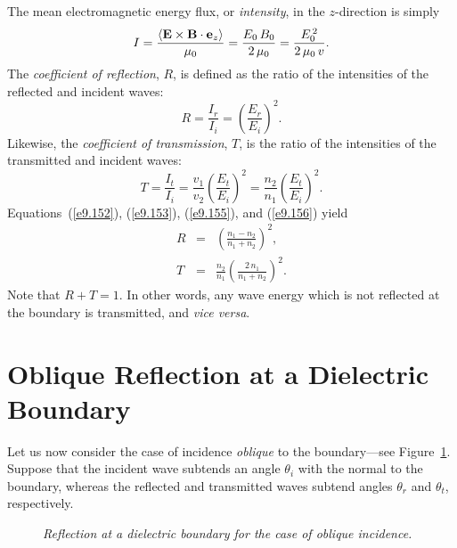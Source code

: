 The mean electromagnetic energy flux, or {\em intensity}, in the $z$-direction is simply
\begin{equation}
I =\frac{\langle {\bf E}\times{\bf B}\cdot{\bf e}_z\rangle}{\mu_0}= \frac{E_0\,B_0}{2\,\mu_0} = \frac{E_0^{\,2}}{2\,\mu_0\,v}.
\end{equation}
The {\em coefficient of reflection}, $R$, is defined as the ratio
of the intensities of the reflected and incident waves:
\begin{equation}\label{e9.155}
R = \frac{I_r}{I_i} = \left(\frac{E_r}{E_i}\right)^2.
\end{equation}
Likewise, the {\em coefficient of transmission}, $T$, is the ratio of
the intensities of the transmitted and incident waves:
\begin{equation}\label{e9.156}
T = \frac{I_t}{I_i} =\frac{v_1}{v_2}\left(\frac{E_t}{E_i}\right)^2=\frac{n_2}{n_1}\left(\frac{E_t}{E_i}\right)^2.
\end{equation}
Equations~(\ref{e9.152}), (\ref{e9.153}), (\ref{e9.155}), and (\ref{e9.156})
yield
\begin{eqnarray}
R &=& \left(\frac{n_1-n_2}{n_1+n_2}\right)^2,\\[0.5ex]
T&=&\frac{n_2}{n_1}\left(\frac{2\,n_1}{n_1+n_2}\right)^2.
\end{eqnarray}
Note that $R+T=1$. In other words, any wave energy which is not reflected
at the boundary is transmitted, and {\em vice versa}.


\section{Oblique Reflection at a Dielectric Boundary}
Let us now consider the case of incidence {\em oblique} to the boundary---see Figure~\ref{f49}.
Suppose that the incident wave subtends an angle $\theta_i$ with the
normal to the boundary, whereas the reflected and transmitted
waves subtend angles $\theta_r$ and $\theta_t$, respectively.

\begin{figure}
\epsfysize=2.5in
\centerline{}
\caption{\em Reflection at a dielectric boundary for the case of oblique incidence.}\label{f49}
\end{figure}


